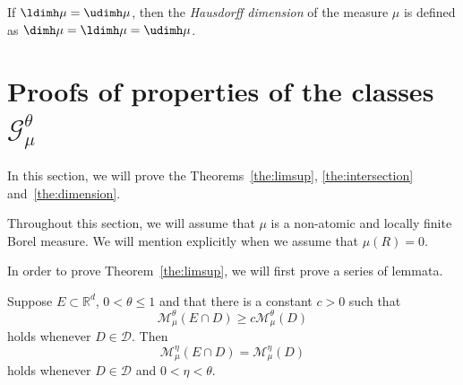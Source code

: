 If $\ldimh \mu = \udimh \mu$, then the {\em Hausdorff dimension} of the measure $\mu$ is defined as $\dimh \mu = \ldimh \mu = \udimh \mu$.


\section{Proofs of properties of the classes \texorpdfstring{$\mathscr{G}_\mu^\theta$}{}} \label{sec:propertiesproofs}

In this section, we will prove the Theorems~\ref{the:limsup}, \ref{the:intersection} and~\ref{the:dimension}.

Throughout this section, we will assume that $\mu$ is a non-atomic and locally finite Borel measure. We will mention explicitly when we assume that $\mu (R) = 0$.

In order to prove Theorem~\ref{the:limsup}, we will first prove a series of lemmata.

\begin{lemm}\label{lem:removec}
Suppose $E \subset \mathbb{R}^d$, $0 < \theta \leq 1$ and that there is a constant $c > 0$ such that
\[
\mathscr{M}_\mu^\theta (E \cap D) \geq c \mathscr{M}_\mu^\theta (D)
\]
holds whenever $D \in \mathscr{D}$. Then
\[
\mathscr{M}_\mu^\eta (E \cap D) = \mathscr{M}_\mu^\eta (D)
\]
holds whenever $D \in \mathscr{D}$ and $0 < \eta < \theta$.
\end{lemm}

